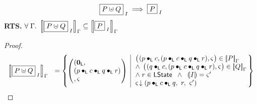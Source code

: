 %
%
\begin{lemma}
%
\[
	\shared{P \sepish Q}{I} \implies \shared{P}{I}
\]
%
\textbf{RTS.} $\for{\lenv} \sem[\lenv]{\shared{P \sepish Q}{I}} \subseteq  \sem[\lenv]{\shared{P}{I}}$
%
\begin{proof}
\[
\begin{array}{r l}
	\sem[\lenv]{\shared{P \sepish Q}{I}} &
	= \left\{
	\hspace*{-0.2cm}
	\begin{array}{l | l}
		\left(
		\hspace*{-0.15cm}
		\begin{array}{l}
		(\unitL, \\
		(p \composeL c \composeL q \composeL r)\\
		, \amod{}
		\end{array}
		\hspace*{-0.15cm}
		\right)
		&
		\hspace*{-0.1cm}
		\begin{array}{l}
			\left(
			\hspace*{-0.15cm}
			\begin{array}{l}
			(p \composeL c, 
			(p \composeL c \composeL q \composeL r)
			, \amod{}
			\end{array}
			\hspace*{-0.15cm}
			\right) \in \sem[\lenv]{P}\\
			
			\land\; \left(
			\hspace*{-0.15cm}
			\begin{array}{l}
			(q \composeL c, 
			(p \composeL c \composeL q \composeL r)
			, \amod{}
			\end{array}
			\hspace*{-0.15cm}
			\right) \in \sem[\lenv]{Q}\\
			
			\land\; r \in \LState \;\;\land\;\; \intermediateSemI{I} = \amod{}'\\
			
			\extendsAM{\amod{}}{p \composeL c \composeL q}{\ r}{\ \amod{}'}
		\end{array}
		\hspace*{-0.1cm}
	\end{array}
	\hspace*{-0.2cm}
	\right\} \\
	
	
	

\end{array}\]
\end{proof}
\end{lemma}
